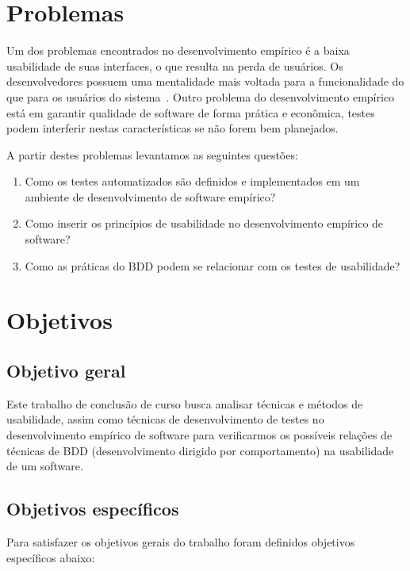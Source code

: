  

\section{Problemas}

Um dos problemas encontrados no desenvolvimento empírico é a baixa usabilidade de suas interfaces, o que resulta na perda de usuários. 
%
Os desenvolvedores possuem uma mentalidade mais voltada para a funcionalidade do que para os usuários do sistema~\cite{santos2012}. 
%
Outro problema do desenvolvimento empírico está em garantir qualidade de software de forma prática e econômica, testes podem interferir nestas características se não forem bem planejados.

A partir destes problemas levantamos as seguintes questões:
	
\begin{enumerate}
\item Como os testes automatizados são definidos e implementados em um ambiente de desenvolvimento de software empírico?
\item Como inserir os princípios de usabilidade no desenvolvimento empírico de software?
\item Como as práticas do BDD podem se relacionar com os testes de usabilidade?
\end{enumerate}

\section{Objetivos}

\subsection{Objetivo geral}
	 
Este trabalho de conclusão de curso busca analisar técnicas e métodos de usabilidade, assim como técnicas de desenvolvimento de testes no desenvolvimento empírico de software para verificarmos os possíveis relações de técnicas de BDD (desenvolvimento dirigido por comportamento) na usabilidade de um software.

	 
\subsection{Objetivos específicos}

Para satisfazer os objetivos gerais do trabalho foram definidos objetivos específicos abaixo:

